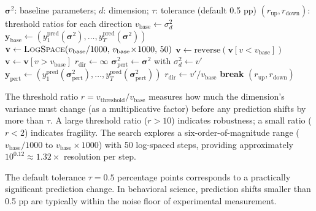 \documentclass[manuscript,review,anonymous]{acmart}
\begin{document}
\begin{algorithm}[t]
\caption{AdversarialThresholdSearch$(\boldsymbol{\sigma}^2, d, \tau)$}
\label{alg:adversarial}
\begin{algorithmic}[1]
\REQUIRE $\boldsymbol{\sigma}^2$: baseline parameters; $d$: dimension; $\tau$: tolerance (default 0.5 pp)
\ENSURE $(r_{\mathrm{up}}, r_{\mathrm{down}})$: threshold ratios for each direction
\STATE $v_{\mathrm{base}} \leftarrow \sigma_d^2$
\STATE $\mathbf{y}_{\mathrm{base}} \leftarrow (y_1^{\mathrm{pred}}(\boldsymbol{\sigma}^2), \ldots, y_T^{\mathrm{pred}}(\boldsymbol{\sigma}^2))$
    \STATE $\mathbf{v} \leftarrow \textsc{LogSpace}(v_{\mathrm{base}}/1000, \, v_{\mathrm{base}} \!\times\! 1000, \, 50)$
        \STATE $\mathbf{v} \leftarrow \text{reverse}(\mathbf{v}[v < v_{\mathrm{base}}])$
    \ELSE %
        \STATE $\mathbf{v} \leftarrow \mathbf{v}[v > v_{\mathrm{base}}]$
    \ENDIF
    \STATE $r_{\mathrm{dir}} \leftarrow \infty$ 
        \STATE $\boldsymbol{\sigma}_{\mathrm{pert}}^2 \leftarrow \boldsymbol{\sigma}^2$ with $\sigma_d^2 \leftarrow v'$
        \STATE $\mathbf{y}_{\mathrm{pert}} \leftarrow (y_1^{\mathrm{pred}}(\boldsymbol{\sigma}_{\mathrm{pert}}^2), \ldots, y_T^{\mathrm{pred}}(\boldsymbol{\sigma}_{\mathrm{pert}}^2))$
            \STATE $r_{\mathrm{dir}} \leftarrow v' / v_{\mathrm{base}}$
            \STATE \textbf{break}
        \ENDIF
    \ENDFOR
\ENDFOR
\RETURN $(r_{\mathrm{up}}, r_{\mathrm{down}})$
\end{algorithmic}
\end{algorithm}

The threshold ratio $r = v_{\mathrm{threshold}} / v_{\mathrm{base}}$ measures how much the dimension's variance must change (as a multiplicative factor) before any prediction shifts by more than $\tau$.
A large threshold ratio ($r > 10$) indicates robustness; a small ratio ($r < 2$) indicates fragility.
The search explores a six-order-of-magnitude range ($v_{\mathrm{base}}/1000$ to $v_{\mathrm{base}} \times 1000$) with 50 log-spaced steps, providing approximately $10^{0.12} \approx 1.32\times$ resolution per step.

The default tolerance $\tau = 0.5$ percentage points corresponds to a practically significant prediction change.
In behavioral science, prediction shifts smaller than 0.5 pp are typically within the noise floor of experimental measurement.
\end{document}
